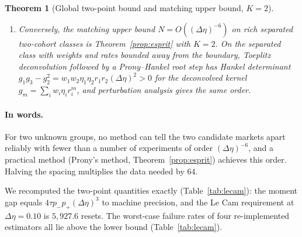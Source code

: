 \documentclass[12pt]{article}
\newtheorem{theorem}{Theorem}[section]
\theoremstyle{definition}
\theoremstyle{remark}
\begin{document}
\begin{theorem}[Global two-point bound and matching upper bound, $K=2$]
\begin{enumerate}[label=(\roman*)]
\[
d_\infty(\hat\theta,\theta)=\min_{\pi\in S_2}\max_{k}\bigl(|\hat w_{\pi(k)}-w_k|+|\hat\eta_{\pi(k)}-\eta_k|\bigr),
\]
because then $d_\infty(\theta_0,\theta_1)=\min\{2\tau(1+\Delta\eta/q),\,(1+2\tau/q)\Delta\eta\}\ge2\tau$. For smaller spacings the relevant permutation-invariant statement is the Wasserstein bound of Theorem~\ref{thm:kcohort}.
\item Conversely, the matching upper bound $N=O((\Delta\eta)^{-6})$ on rich separated two-cohort classes is Theorem~\ref{prop:esprit} with $K=2$. On the separated class with weights and rates bounded away from the boundary, Toeplitz deconvolution followed by a Prony--Hankel root step has Hankel determinant $g_1g_3-g_2^2=w_1w_2\eta_1\eta_2r_1r_2(\Delta\eta)^2>0$ for the deconvolved kernel $g_m=\sum_iw_i\eta_ir_i^m$, and perturbation analysis gives the same order.
\end{enumerate}
\end{theorem}

\paragraph{In words.} For two unknown groups, no method can tell the two candidate markets apart reliably with fewer than a number of experiments of order $(\Delta\eta)^{-6}$, and a practical method (Prony's method, Theorem~\ref{prop:esprit}) achieves this order. Halving the spacing multiplies the data needed by 64.

We recomputed the two-point quantities exactly (Table~\ref{tab:lecam}): the moment gap equals $4\tau p_-p_+(\Delta\eta)^3$ to machine precision, and the Le Cam requirement at $\Delta\eta=0.10$ is $5{,}927.6$ resets. The worst-case failure rates of four re-implemented estimators all lie above the lower bound (Table~\ref{tab:lecam}).
\end{document}
